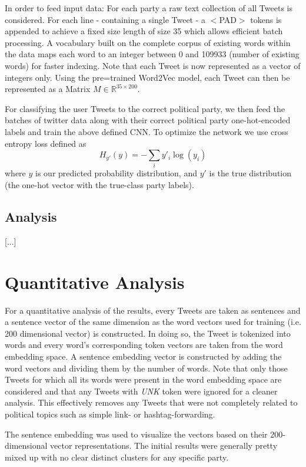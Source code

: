 \documentclass[10pt, oneside]{article}
\begin{document}
\begin{multicols}{2}
In order to feed input data: For each party a raw text collection of all Tweets is considered. For each line - containing a single Tweet - a $<$PAD$>$ tokens is appended to achieve a fixed size length of size 35 which allows efficient batch processing. A vocabulary built on the complete corpus of existing words within the data maps each word to an integer between 0 and 109933 (number of existing words) for faster indexing.
Note that each Tweet is now represented as a vector of integers only. Using the pre=trained Word2Vec model, each Tweet can then be represented as a Matrix $M \in \mathbb{R}^{35 \times 200}$.

For classifying the user Tweets to the correct political party, we then feed the batches of twitter data along with their correct political party one-hot-encoded labels and train the above defined CNN. To optimize the network we use cross entropy loss defined as
\begin{equation*}
	H_{y'}(y) = - \sum_{i} y'_{i} \log (y_{i})
\end{equation*}
where $y$ is our predicted probability distribution, and $y'$ is the true distribution (the one-hot vector with the true-class party labels). 

\subsection{Analysis}

[...]


\section{Quantitative Analysis}

For a quantitative analysis of the results, every Tweets are taken as sentences and a sentence vector of the same dimension as the word vectors used for training (i.e. 200 dimensional vector) is constructed. In doing so, the Tweet is tokenized into words and every word's corresponding token vectors are taken from the word embedding space. A sentence embedding vector is constructed by adding the word vectors and dividing them by the number of words. Note that only those Tweets for which all its words were present in the word embedding space are considered and that any Tweets with \emph{UNK} token were ignored for a cleaner analysis. This effectively removes any Tweets that were not completely related to political topics such as simple link- or hashtag-forwarding. 

The sentence embedding was used to visualize the vectors based on their 200-dimensional vector representations. The initial results were generally pretty mixed up with no clear distinct clusters for any specific party.


\end{multicols}
\end{document}
